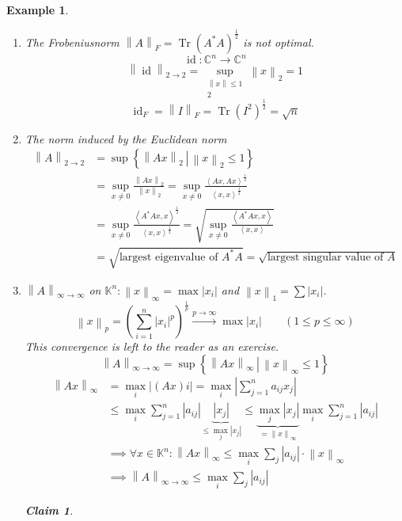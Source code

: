 \documentclass{article}
\newtheorem{example}{Example}  \numberwithin{example}{section}
\newtheorem*{claim}{Claim}%
\newcommand{\setdef}[2]{\left\{\left.#1\,\right|\,#2\right\}}
\newcommand{\angel}[1]{\left\langle#1\right\rangle}
\newcommand{\norm}[1]{\left\|#1\right\|}
\newcommand{\card}[1]{\left|#1\right|}
\begin{document}
\begin{example} %
  \begin{enumerate}
    \item The Frobeniusnorm $\norm{A}_F = \operatorname{Tr}(A^* A)^{\frac12}$ is not optimal.
      \[ \operatorname{id}: \mathbb C^n \to \mathbb C^n \]
      \[ \norm{\operatorname{id}}_{2 \to 2} = \sup_{\substack{\norm{x} \leq 1 \\ 2}} \norm{x}_2 = 1 \]
      \[ \operatorname{id}_F = \norm{I}_F = \operatorname{Tr}(I^2)^{\frac12} = \sqrt n \]
    \item The norm induced by the Euclidean norm
      \begin{align*}
        \norm{A}_{2 \to 2} &= \sup\setdef{\norm{Ax}_2}{\norm{x}_2 \leq 1} \\
          &= \sup_{x \neq 0} \frac{\norm{Ax}_2}{\norm{x}_2} = \sup_{x \neq 0} \frac{\angel{Ax, Ax}^{\frac12}}{\angel{x,x}^{\frac12}} \\
          &= \sup_{x \neq 0} \frac{\angel{A^* Ax, x}^{\frac12}}{\angel{x,x}^{\frac12}} = \sqrt{\sup_{x \neq 0} \frac{\angel{A^* Ax, x}}{\angel{x,x}}} \\
          &= \sqrt{\text{largest eigenvalue of } A^* A} = \sqrt{\text{largest singular value of } A}
      \end{align*}
    \item
      $\norm{A}_{\infty\to\infty}$ on $\mathbb K^n: \norm{x}_{\infty} = \max \card{x_i}$ and $\norm{x}_1 = \sum \card{x_i}$.
      \[ \norm{x}_p = \left(\sum_{i=1}^n \card{x_i}^p\right)^{\frac1p} \xrightarrow{p \to \infty} \max \card{x_i} \qquad (1 \leq p \leq \infty) \]
      This convergence is left to the reader as an exercise.
      \[ \norm{A}_{\infty\to\infty} = \sup\setdef{\norm{Ax}_{\infty}}{\norm{x}_\infty \leq 1} \]
      \begin{align*}
        \norm{Ax}_{\infty} &= \max_i \card{(Ax) i} = \max_i \card{\sum_{j=1}^n a_{ij} x_j} \\
          &\leq \max_i \sum_{j=1}^n \card{a_{ij}} \underbrace{\card{x_j}}_{\leq \max_j \card{x_j}}
           \leq \underbrace{\max_j \card{x_j}}_{= \norm{x}_{\infty}} \max_i \sum_{j=1}^n \card{a_{ij}} \\
          &\implies \forall x \in \mathbb K^n: \norm{Ax}_{\infty} \leq \max_i \sum_j \card{a_{ij}} \cdot \norm{x}_{\infty} \\
          &\implies \norm{A}_{\infty\to\infty} \leq \max_i \sum_j \card{a_{ij}}
      \end{align*}
      \begin{claim}

\end{claim}
\end{enumerate}
\end{example}
\end{document}
